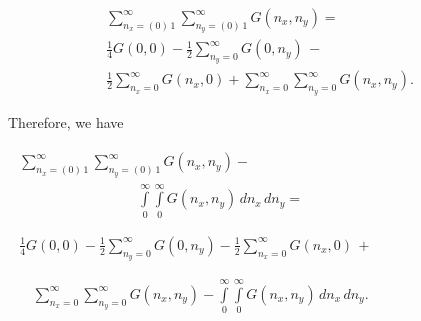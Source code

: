 \documentclass[twoside, 10pt]{article}
\begin{document}
\begin{multicols}{2}
\begin{equation} \label{eq:13}
\begin{array}{c}
    \sum\limits_{n_x=\left(0\right)\,1}^{\infty} \sum\limits_{n_y=\left(0\right)\,1}^{\infty} {G\left(n_x, n_y\right)} = \\
 \frac{1}{4}G\left(0, 0\right) - \frac{1}{2}\sum\limits_{n_y=0}^{\infty}{G\left(0, n_y\right)}\, - \\
\frac{1}{2}\sum\limits_{n_x=0}^{\infty}{G\left(n_x, 0\right)} + \sum\limits_{n_x=0}^{\infty}\sum\limits_{n_y=0}^{\infty}{G\left(n_x, n_y\right)}.
\end{array}
\end{equation}

    Therefore, we have

\noindent
\(\begin{array}{l}
\begin{array}{ll}
\sum\limits_{n_x=\left(0\right)\,1}^{\infty} \sum\limits_{n_y=\left(0\right)\,1}^{\infty} G\left(n_x, n_y\right)
 - \\
\,\,\,\,\,\,\,\,\,\,\,\,\,\,\,\,\,\,\,\,\,\,\,\,\,\,\,\,\,\,\,\,\,\,\,\,\,\,\,\,\,\,\,\,\,\,\,\,\,\,\,\int\limits_{0}^{\infty} \int\limits_{0}^{\infty} G\left(n_x, n_y\right)\,d{n_x}\,d{n_y} = & \, \\
\end{array} \\
\begin{array}{c}
\frac{1}{4}G\left(0, 0\right) -\frac{1}{2}\sum\limits_{n_y=0}^{\infty}{G\left(0, n_y\right)} -\frac{1}{2}\sum\limits_{n_x=0}^{\infty}{G\left(n_x, 0\right)}\, + \\
\end{array} \\
\begin{array}{rr}
\, & \sum\limits_{n_x=0}^{\infty}\sum\limits_{n_y=0}^{\infty}{G\left(n_x, n_y\right)} - \int\limits_{0}^{\infty} \int\limits_{0}^{\infty} G\left(n_x, n_y\right)\,d{n_x}\,d{n_y}.
\end{array}
\end{array}\)


\end{multicols}
\end{document}
